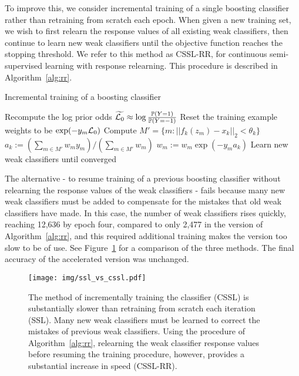 \documentclass[conference]{IEEEtran}
\newcommand{\logprior}{\log \frac{\Pr(Y = 1)}{\Pr(Y = -1)}}
\begin{document}
To improve this, we consider incremental training of a single boosting classifier rather than retraining from scratch each epoch.  When given a new training set, we wish to first relearn the response values of all existing weak classifiers, then continue to learn new weak classifiers until the objective function reaches the stopping threshold.  We refer to this method as CSSL-RR, for continuous semi-supervised learning with response relearning.  This procedure is described in Algorithm~\ref{alg:rr}.

\begin{algorithm}[h]
  \caption{Incremental training of a boosting classifier}
  \label{alg:rr}
  \begin{algorithmic}
    \STATE Recompute the log prior odds $\widetilde{\L_0} \approx \logprior$
    \STATE Reset the training example weights to be $\exp(-y_m \mathcal{L}_0)$
    \STATE Compute $M' = \{m : ||f_k(z_m) - x_k||_2 < \theta_k\}$
    \STATE $a_k := \left( \sum_{m \in M'} w_m y_m \right) /  \left( \sum_{m \in M'} w_m \right)$
    \STATE $w_m := w_m \exp(-y_m a_k)$
    \ENDFOR
    \ENDFOR
    \STATE Learn new weak classifiers until converged
  \end{algorithmic}
\end{algorithm}

The \naive alternative - to resume training of a previous boosting classifier without relearning the response values of the weak classifiers - fails because many new weak classifiers must be added to compensate for the mistakes that old weak classifiers have made.  In this case, the number of weak classifiers rises quickly, reaching 12,636 by epoch four, compared to only 2,477 in the version of Algorithm~\ref{alg:rr}, and this required additional training makes the \naive version too slow to be of use.  See Figure~\ref{fig:cssl} for a comparison of the three methods.  The final accuracy of the accelerated version was unchanged.

\begin{figure}
  \centering
  \texttt{[image: img/ssl\_vs\_cssl.pdf]}
  \caption{The \naive method of incrementally training the classifier (CSSL) is substantially slower than retraining from scratch each iteration (SSL).  Many new weak classifiers must be learned to correct the mistakes of previous weak classifiers.  Using the procedure of Algorithm~\ref{alg:rr}, \ie relearning the weak classifier response values before resuming the training procedure, however, provides a substantial increase in speed (CSSL-RR).}
  \label{fig:cssl}
\end{figure}
\end{document}
